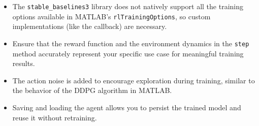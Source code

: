 \documentclass[12pt]{article}
\begin{document}
\begin{itemize}
    \item The \texttt{stable\_baselines3} library does not natively support all the training options available in MATLAB's \texttt{rlTrainingOptions}, so custom implementations (like the callback) are necessary.
    \item Ensure that the reward function and the environment dynamics in the \texttt{step} method accurately represent your specific use case for meaningful training results.
    \item The action noise is added to encourage exploration during training, similar to the behavior of the DDPG algorithm in MATLAB.
    \item Saving and loading the agent allows you to persist the trained model and reuse it without retraining.
\end{itemize}
\end{document}
